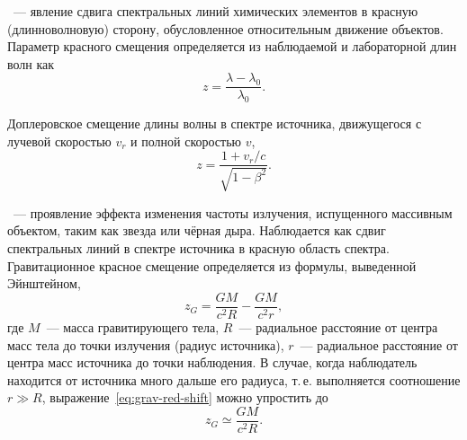 ~--- явление сдвига спектральных линий химических элементов в красную (длинноволновую) сторону, обусловленное относительным движение объектов. Параметр красного смещения определяется из наблюдаемой и лабораторной длин волн как
\begin{equation}
z = \dfrac{\lambda - \lambda_0}{\lambda_0}.
\end{equation}

Доплеровское смещение длины волны в спектре источника, движущегося с лучевой скоростью $v_{r}$ и полной скоростью $v$,
\begin{equation}
z = \dfrac{1 + v_r / c}{\sqrt{1 - \beta^2}}.
\end{equation}

~--- проявление эффекта изменения частоты излучения, испущенного массивным объектом, таким как звезда или чёрная дыра. Наблюдается как сдвиг спектральных линий в спектре источника в красную область спектра. Гравитационное красное смещение определяется из формулы, выведенной Эйнштейном,
\begin{equation}
z_G=\dfrac{GM}{c^2 R}-\dfrac{GM}{c^2 r},
\label{eq:grav-red-shift}
\end{equation}
где $M$~--- масса гравитирующего тела, $R$~--- радиальное расстояние от центра масс тела до точки излучения (радиус источника), $r$~---  радиальное расстояние от центра масс источника до точки наблюдения. В случае, когда наблюдатель находится от источника много дальше его радиуса, т.\,е. выполняется соотношение $r \gg R$, выражение~\eqref{eq:grav-red-shift} можно упростить до
\begin{equation}
z_G \simeq \dfrac{GM}{c^2 R}.
\end{equation}

